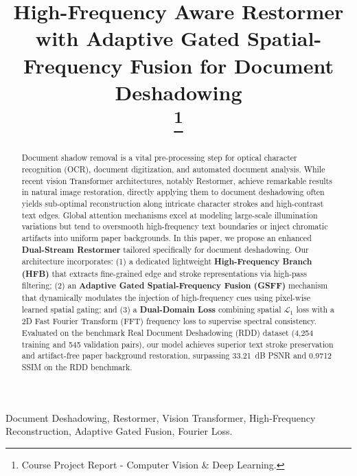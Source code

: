 \documentclass[conference]{IEEEtran}
\begin{document}
\title{High-Frequency Aware Restormer with Adaptive Gated Spatial-Frequency Fusion for Document Deshadowing\\
\thanks{Course Project Report - Computer Vision \& Deep Learning.}
}

\author{
}

\maketitle

\begin{abstract}
Document shadow removal is a vital pre-processing step for optical character recognition (OCR), document digitization, and automated document analysis. While recent vision Transformer architectures, notably Restormer, achieve remarkable results in natural image restoration, directly applying them to document deshadowing often yields sub-optimal reconstruction along intricate character strokes and high-contrast text edges. Global attention mechanisms excel at modeling large-scale illumination variations but tend to oversmooth high-frequency text boundaries or inject chromatic artifacts into uniform paper backgrounds. In this paper, we propose an enhanced \textbf{Dual-Stream Restormer} tailored specifically for document deshadowing. Our architecture incorporates: (1) a dedicated lightweight \textbf{High-Frequency Branch (HFB)} that extracts fine-grained edge and stroke representations via high-pass filtering; (2) an \textbf{Adaptive Gated Spatial-Frequency Fusion (GSFF)} mechanism that dynamically modulates the injection of high-frequency cues using pixel-wise learned spatial gating; and (3) a \textbf{Dual-Domain Loss} combining spatial $\mathcal{L}_1$ loss with a 2D Fast Fourier Transform (FFT) frequency loss to supervise spectral consistency. Evaluated on the benchmark Real Document Deshadowing (RDD) dataset (4,254 training and 545 validation pairs), our model achieves superior text stroke preservation and artifact-free paper background restoration, surpassing 33.21~dB PSNR and 0.9712 SSIM on the RDD benchmark.
\end{abstract}

\begin{IEEEkeywords}
Document Deshadowing, Restormer, Vision Transformer, High-Frequency Reconstruction, Adaptive Gated Fusion, Fourier Loss.
\end{IEEEkeywords}
\end{document}
